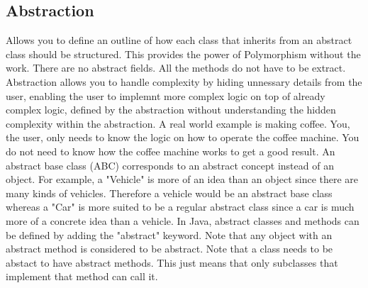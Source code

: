 \documentclass[a4paper, 11pt]{article}
\begin{document}
    \subsection{Abstraction}
        Allows you to define an outline of how each class that inherits from an abstract class should be structured.  This provides the power of Polymorphism without the work.  There are no abstract fields.  All the methods do not have to be extract.
        \newline\newline
        Abstraction allows you to handle complexity by hiding unnessary details from the user, enabling the user to implemnt more complex logic on top of already complex logic, defined by the abstraction without understanding the hidden complexity within the abstraction.
        \newline\newline
        A real world example is making coffee.  You, the user, only needs to know the logic on how to operate the coffee machine.  You do not need to know how the coffee machine works to get a good result.
        \newline\newline
        An abstract base class (ABC) corresponds to an abstract concept instead of an object.  For example, a "Vehicle" is more of an idea than an object since there are many kinds of vehicles.  Therefore a vehicle would be an abstract base class whereas a "Car" is more suited to be a regular abstract class since a car is much more of a concrete idea than a vehicle.
        \newline\newline
        In Java, abstract classes and methods can be defined by adding the "abstract" keyword.  Note that any object with an abstract method is considered to be abstract.  Note that a class needs to be abstact to have abstract methods.  This just means that only subclasses that implement that method can call it.
\end{document}
